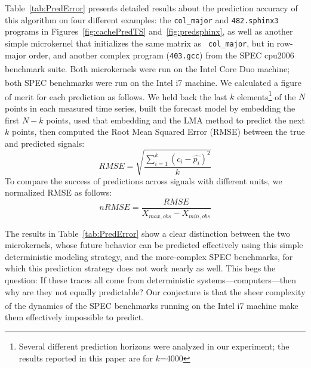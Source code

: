 \documentclass{article}
\begin{document}
Table~\ref{tab:PredError} presents detailed results about the
prediction accuracy of this algorithm on four different examples: the
{\tt col\_major} and {\tt 482.sphinx3} programs in
Figures~\ref{fig:cachePredTS} and~\ref{fig:predsphinx}, as well as
another simple microkernel that initializes the same matrix as {\tt
  col\_major}, but in row-major order, and another complex program
({\tt 403.gcc}) from the SPEC cpu2006 benchmark suite.  Both
microkernels were run on the Intel Core
Duo\textsuperscript{\textregistered} machine; both SPEC benchmarks
were run on the Intel i7\textsuperscript{\textregistered} machine.  We
calculated a figure of merit for each prediction as follows.  We held
back the last $k$ elements\footnote{Several different prediction
  horizons were analyzed in our experiment; the results reported in
  this paper are for $k$=4000} of the $N$ points in each measured time
series, built the forecast model by embedding the first $N-k$ points,
used that embedding and the LMA method to predict the next $k$ points,
then computed the Root Mean Squared Error (RMSE) between the true and
predicted signals:
$$RMSE = \sqrt{\frac{\sum_{i=1}^k(c_i-\hat{p_i})^2}{k}}$$
%
To compare the success of predictions across signals with different
units, we normalized RMSE as follows:
$$nRMSE = \frac{RMSE}{X_{max,obs}-X_{min,obs}}$$
%



The results in Table~\ref{tab:PredError} show a clear distinction
between the two microkernels, whose future behavior can be
predicted effectively using this simple deterministic modeling
strategy, and the more-complex SPEC benchmarks, for which this
prediction strategy does not work nearly as well.
%
This begs the question: If these traces all come from deterministic
systems---computers---then why are they not equally predictable?  Our
conjecture is that the sheer complexity of the dynamics of the SPEC
benchmarks running on the Intel i7\textsuperscript{\textregistered}
machine make them effectively impossible to predict.

\end{document}
